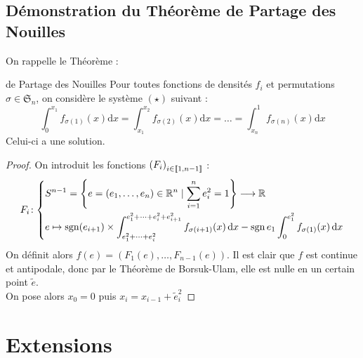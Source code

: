 \documentclass{cours}
\begin{document}
\subsection{Démonstration du Théorème de Partage des Nouilles}
On rappelle le Théorème\! :
\begin{théorème}{de Partage des Nouilles}{}
Pour toutes fonctions de densités $f_{i}$ et permutations $\sigma \in \mathfrak{S}_{n}$, on considère le système $(\star)$ suivant\! :
\begin{equation*}\tag{$\star$}
    \int_{0}^{x_{1}}f_{\sigma(1)}(x) \mathrm{d}x = \int_{x_{1}}^{x_{2}}f_{\sigma(2)}(x)\mathrm{d}x = \ldots = \int_{x_{n}}^{1}f_{\sigma(n)}(x) \mathrm{d}x
\end{equation*}
Celui-ci a une solution.
\end{théorème}

\begin{proof}
    On introduit les fonctions $\left(F_{i}\right)_{i\in \left\llbracket 1, n - 1\right\rrbracket}$ \! :
    \[
        F_{i}\! : \left\{
        \begin{aligned}
             & S^{n - 1} = \left\{e = (e_{1}, \ldots, e_{n}) \in \mathbb{R}^{n} \mid \sum_{i = 1}^{n} e_{i}^{2} = 1\right\} \longrightarrow \mathbb{R}                                                                                \\
             & e \mapsto \operatorname{sgn}(e_{i + 1}) \times \int_{e_{1}^{2} + \cdots + e_{i}^{2}}^{e_{1}^{2} + \cdots + e_{i}^{2} + e_{i + 1}^{2}} f_{\sigma(i + 1)}(x){\rm \, d} x - \operatorname{sgn}{e_{1}}\int_{0}^{e_{1}^{2}}f_{\sigma(1)}(x){\rm \, d} x
        \end{aligned}\right.
    \]
    On définit alors $f(e) = \left(F_{1}(e), \ldots, F_{n - 1}(e)\right)$. Il est clair que $f$ est continue et antipodale, donc par le Théorème de Borsuk-Ulam, elle est nulle en un certain point $\tilde{e}$.\\
    On pose alors $x_{0} = 0$ puis $x_{i} = x_{i - 1} + \tilde{e}_{i}^{2}$
\end{proof}


\section{Extensions}
\end{document}
